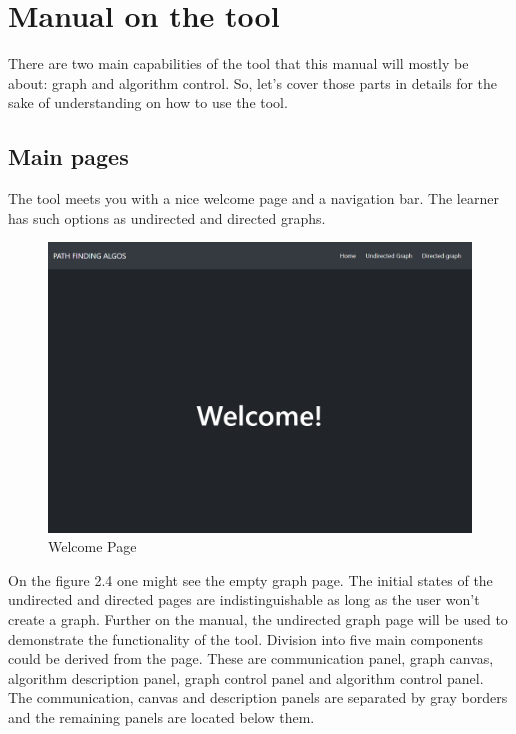 \section{Manual on the tool}

There are two main capabilities of the tool that this manual will mostly be about: graph and algorithm control. So, let's cover those parts in details for the sake of understanding on how to use the tool.

\subsection{Main pages}

The tool meets you with a nice welcome page and a navigation bar. The learner has such options as undirected and directed graphs.

\begin{figure}[H]
	\centering
	\includegraphics[width=\textwidth]{images/welcome_page.png}
	\caption{Welcome Page}
\end{figure}

On the figure 2.4 one might see the empty graph page. The initial states of the undirected and directed pages are indistinguishable as long as the user won't create a graph. Further on the manual, the undirected graph page will be used to demonstrate the functionality of the tool. Division into five main components could be derived from the page. These are communication panel, graph canvas, algorithm description panel, graph control panel and algorithm control panel. The communication, canvas and description panels are separated by gray borders and the remaining panels are located below them.

